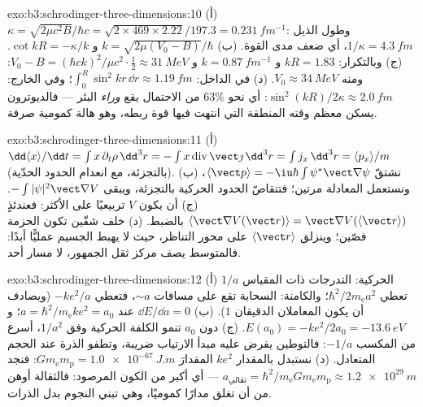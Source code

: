 \begin{solution}{exo:b3:schrodinger-three-dimensions:10}
(أ) $\kappa = \sqrt{2\mu c^2B}/\hbar c = \sqrt{2 \times 469 \times
2.22}/197.3 = \qty{0.231}{fm^{-1}}$: وطول الذيل $1/\kappa =
\qty{4.3}{fm}$، أي ضعف مدى القوة. (ب) $k =
\sqrt{2\mu(V_0 - B)}/\hbar$ و $\cot kR = -\kappa/k$. (ج) وبالتكرار:
$kR = 1.83$ و $k = \qty{0.87}{fm^{-1}}$ و $V_0 - B = (\hbar ck)^2/\mu
c^2\cdot\tfrac12 \approx \qty{31}{MeV}$: ومنه $V_0 \approx \qty{34}{MeV}$.
(د) في الداخل: $\int_0^R\sin^2kr\,\dd r \approx \qty{1.19}{fm}$؛
وفي الخارج: $\sin^2(kR)/2\kappa \approx \qty{2.0}{fm}$: أي نحو $63\%$ من
الاحتمال يقع \emph{وراء} البئر --- فالديوترون يسكن معظم وقته
المنطقة التي انتهت فيها قوة ربطه، وهو هالة كمومية صرفة.
\end{solution}

\begin{solution}{exo:b3:schrodinger-three-dimensions:11}
(أ) $\dd\langle x\rangle/\dd t = \int x\,\partial_t\rho\,\dd^3r =
-\int x\operatorname{div}\vect\jmath\,\dd^3r = \int j_x\,\dd^3r =
\langle p_x\rangle/m$ (بالتجزئة، مع انعدام الحدود الحدّية). (ب)
نشتقّ $\langle\vect p\rangle = -\iu\hbar\int\psi^*\vect\nabla
\psi$، ونستعمل المعادلة مرتين؛ فتتقاصّ الحدود الحركية بالتجزئة،
ويبقى $-\int|\psi|^2\vect\nabla V$. (ج) أن يكون $V$ تربيعيًا على الأكثر:
فعندئذٍ $\langle\vect\nabla V(\vect r)\rangle = \vect\nabla V(\langle
\vect r\rangle)$ بالضبط. (د) خلف شقّين تكون الحزمة
فصّين؛ وينزلق $\langle\vect r\rangle$ على محور التناظر، حيث
لا يهبط الجسيم عمليًّا أبدًا: فالمتوسط يصف مركز ثقل
الجمهور، لا مسار أحد.
\end{solution}

\begin{solution}{exo:b3:schrodinger-three-dimensions:12}
(أ) الحركية: التدرجات ذات المقياس $1/a$ تعطي $\hbar^2/2m_{\text{e}}
a^2$؛ والكامنة: السحابة تقع على مسافات $\sim a$، فتعطي
$-ke^2/a$ (ويصادف أن يكون المعاملان الدقيقان $1$). (ب) $\dd E/\dd
a = 0$ عند $a = \hbar^2/m_{\text{e}}ke^2 = a_0$؛ و $E(a_0) =
-ke^2/2a_0 = \qty{-13.6}{eV}$. (ج) دون $a_0$ تنمو الكلفة الحركية
وفق $1/a^2$، أسرع من المكسب $-1/a$: فالتوطين
يفرض عليه مبدأ الارتياب ضريبة، وتطفو الذرة عند الحجم
المتعادل. (د) نستبدل بالمقدار $ke^2$ المقدارَ $Gm_{\text{e}}m_{\text{p}} =
\qty{1.0e-67}{J.m}$: فنجد $a_{\text{ثقالي}} = \hbar^2/m_{\text{e}}G
m_{\text{e}}m_{\text{p}} \approx \qty{1.2e29}{m}$ --- أي أكبر من
الكون المرصود: فالثقالة أوهن من أن تغلق مدارًا كموميًا،
وهي تبني النجوم بدل الذرات.
\end{solution}


